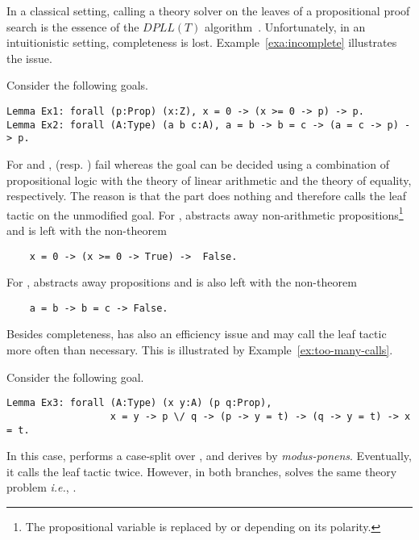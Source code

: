 \documentclass[utf8,a4paper,UKenglish,cleveref, autoref, thm-restate]{lipics-v2019}
\begin{document}
In a classical setting, calling a theory solver on the leaves of a
propositional proof search is the essence of the $\mathit{DPLL(T)}$
algorithm~\cite{GanzingerHNOT04}.  Unfortunately, in an intuitionistic
setting, completeness is lost. Example~\ref{exa:incomplete}
illustrates the issue.
\begin{example}
  \label{exa:incomplete}
  Consider the following goals.
  \begin{verbatim}
Lemma Ex1: forall (p:Prop) (x:Z), x = 0 -> (x >= 0 -> p) -> p.
Lemma Ex2: forall (A:Type) (a b c:A), a = b -> b = c -> (a = c -> p) -> p.
\end{verbatim}
  For  and ,  (resp. ) fail whereas
  the goal can be decided using a combination of
  propositional logic with the theory of linear arithmetic and
  the theory of equality, respectively.
  The reason is that the  part does nothing and
  therefore calls the leaf tactic on the unmodified goal.  For
  ,  abstracts away non-arithmetic
  propositions\footnote{The propositional variable  is replaced by
     or  depending on its polarity.} and is
  left with the non-theorem
  \begin{verbatim}
    x = 0 -> (x >= 0 -> True) ->  False.
  \end{verbatim}
  For ,  abstracts away
  propositions and is also left with the non-theorem
  \begin{verbatim}
    a = b -> b = c -> False.
  \end{verbatim}
\end{example}
Besides completeness,  has also an efficiency issue and may call the leaf tactic 
more often than necessary. %
This is illustrated by Example~\ref{ex:too-many-calls}.
\begin{example}
  \label{ex:too-many-calls}
  Consider the following goal.
  \begin{verbatim}
Lemma Ex3: forall (A:Type) (x y:A) (p q:Prop),
                  x = y -> p \/ q -> (p -> y = t) -> (q -> y = t) -> x = t.
  \end{verbatim}
  In this case,  performs a case-split
  over , and derives  by
  \emph{modus-ponens}. Eventually, it calls the leaf tactic
   twice.  However, in both branches,
   solves the same theory problem \emph{i.e.},
  .
\end{example}
\end{document}
